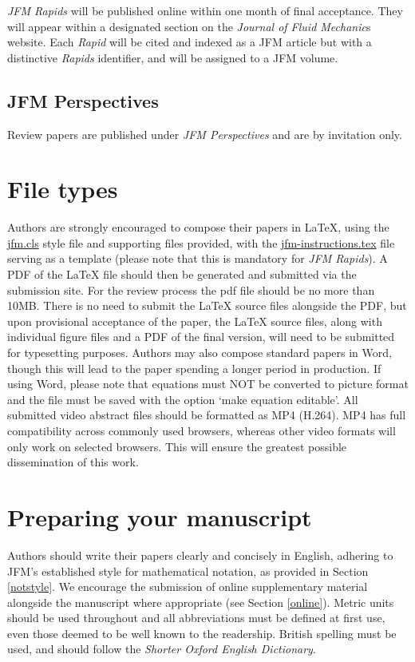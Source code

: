 \documentclass[lineno]{jfm}
\begin{document}
{\it JFM Rapids} will be published online within one month of final acceptance.  They will appear within a designated section on the {\it Journal of Fluid Mechanic}s website.  Each {\it Rapid} will be cited and indexed as a JFM article but with a distinctive {\it Rapids} identifier, and will be assigned to a JFM volume.

\subsection{JFM Perspectives}
 Review papers are published under {\it JFM Perspectives } and are by invitation only.

\section{File types}\label{sec:filetypes}
 Authors are strongly encouraged to compose their papers in {\LaTeX}, using the \href{https://www.cambridge.org/core/journals/journal-of-fluid-mechanics/information/instructions-contributors} {jfm.cls} style file and supporting files provided, with the \href{https://www.cambridge.org/core/journals/journal-of-fluid-mechanics/information/instructions-contributors} {jfm-instructions.tex} file serving as a template (please note that this is mandatory for {\it JFM Rapids}). A PDF of the {\LaTeX} file should then be generated and submitted via the submission site. For the review process the pdf file should be no more than 10MB. There is no need to submit the {\LaTeX} source files alongside the PDF, but upon provisional acceptance of the paper, the {\LaTeX} source files, along with individual figure files and a PDF of the final version, will need to be submitted for typesetting purposes.
Authors may also compose standard papers in Word, though this will lead to the paper spending a longer period in production. If using Word, please note that equations must NOT be converted to picture format and the file must be saved with the option `make equation editable'. All submitted video abstract files should be formatted as MP4 (H.264). MP4 has full compatibility across commonly used browsers, whereas other video formats will only work on selected browsers. This will ensure the greatest possible dissemination of this work.
\section{Preparing your manuscript}
 Authors should write their papers clearly and concisely in English, adhering to JFM's established style for mathematical notation, as provided in Section \ref{notstyle}. We encourage the submission of online supplementary material alongside the manuscript where appropriate (see Section \ref{online}). Metric units should be used throughout and all abbreviations must be defined at first use, even those deemed to be well known to the readership. British spelling must be used, and should follow the \textit{Shorter Oxford English Dictionary}.
\end{document}
